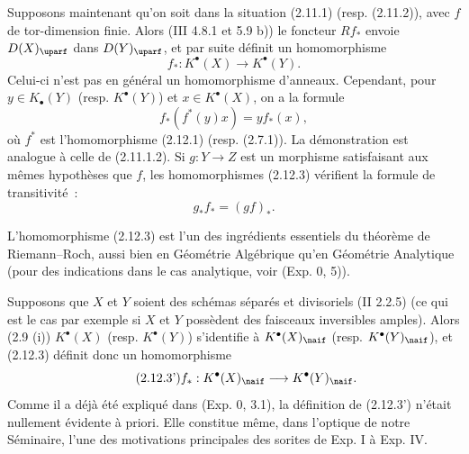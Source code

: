 Supposons maintenant qu'on soit dans la situation (2.11.1) (resp. (2.11.2)), avec \(f\) de tor-dimension finie. Alors (III 4.8.1 et 5.9 b)) le foncteur \(Rf_*\) envoie \(D(X)_{\uparf}\) dans \(D(Y)_{\uparf}\), et par suite définit un homomorphisme
\begin{equation}\tag{2.12.3}
 f_*:K^{\bullet}(X)\longrightarrow K^{\bullet}(Y).
\end{equation}
Celui-ci n'est pas en général un homomorphisme d'anneaux. Cependant, pour \(y\in K_{\bullet}(Y)\) (resp. \(K^{\bullet}(Y)\)) et \(x\in K^{\bullet}(X)\), on a la formule
\begin{equation}\tag{2.12.4}
 f_*(f^*(y)x)=y f_*(x),
\end{equation}
où \(f^*\) est l'homomorphisme (2.12.1) (resp. (2.7.1)). La démonstration est analogue à celle de (2.11.1.2). Si \(g:Y\to Z\) est un morphisme satisfaisant aux mêmes hypothèses que \(f\), les homomorphismes (2.12.3) vérifient la formule de transitivité~:
\begin{equation}\tag{2.12.3.1}
 g_*f_*=(gf)_*.
\end{equation}

L'homomorphisme (2.12.3) est l'un des ingrédients essentiels du théorème de Riemann--Roch, aussi bien en Géométrie Algébrique qu'en Géométrie Analytique (pour des indications dans le cas analytique, voir (Exp. 0, 5)).

Supposons que \(X\) et \(Y\) soient des schémas séparés et divisoriels (II 2.2.5) (ce qui est le cas par exemple si \(X\) et \(Y\) possèdent des faisceaux inversibles amples). Alors (2.9 (i)) \(K^{\bullet}(X)\) (resp. \(K^{\bullet}(Y)\)) s'identifie à \(K^{\bullet}(X)_{\naif}\) (resp. \(K^{\bullet}(Y)_{\naif}\)), et (2.12.3) définit donc un homomorphisme
\begin{equation}\tag{2.12.3'}
 f_*:K^{\bullet}(X)_{\naif}\longrightarrow K^{\bullet}(Y)_{\naif}.
\end{equation}
Comme il a déjà été expliqué dans (Exp. 0, 3.1), la définition de (2.12.3') n'était nullement évidente à priori. Elle constitue même, dans l'optique de notre Séminaire, l'une des motivations principales des
sorites de Exp. I à Exp. IV.


